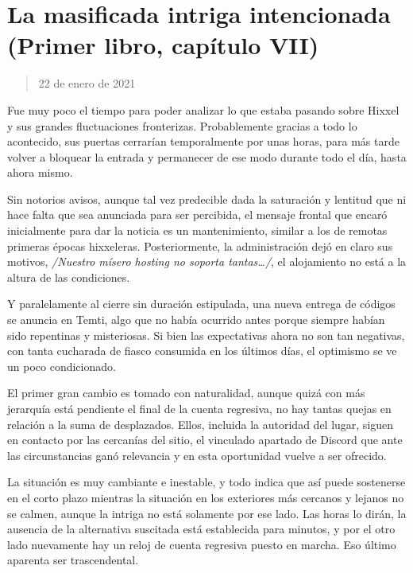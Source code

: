 \documentclass[
]{book}
\begin{document}
\hypertarget{la-masificada-intriga-intencionada-primer-libro-capuxedtulo-vii}{%
\section{La masificada intriga intencionada (Primer libro, capítulo VII)}\label{la-masificada-intriga-intencionada-primer-libro-capuxedtulo-vii}}

\begin{quote}
22 de enero de 2021
\end{quote}

Fue muy poco el tiempo para poder analizar lo que estaba pasando sobre Hixxel y sus grandes fluctuaciones fronterizas. Probablemente gracias a todo lo acontecido, sus puertas cerrarían temporalmente por unas horas, para más tarde volver a bloquear la entrada y permanecer de ese modo durante todo el día, hasta ahora mismo.

Sin notorios avisos, aunque tal vez predecible dada la saturación y lentitud que ni hace falta que sea anunciada para ser percibida, el mensaje frontal que encaró inicialmente para dar la noticia es un mantenimiento, similar a los de remotas primeras épocas hixxeleras. Posteriormente, la administración dejó en claro sus motivos, \emph{/Nuestro mísero hosting no soporta tantas\ldots/}, el alojamiento no está a la altura de las condiciones.

Y paralelamente al cierre sin duración estipulada, una nueva entrega de códigos se anuncia en Temti, algo que no había ocurrido antes porque siempre habían sido repentinas y misteriosas. Si bien las expectativas ahora no son tan negativas, con tanta cucharada de fiasco consumida en los últimos días, el optimismo se ve un poco condicionado.

El primer gran cambio es tomado con naturalidad, aunque quizá con más jerarquía está pendiente el final de la cuenta regresiva, no hay tantas quejas en relación a la suma de desplazados. Ellos, incluida la autoridad del lugar, siguen en contacto por las cercanías del sitio, el vinculado apartado de Discord que ante las circunstancias ganó relevancia y en esta oportunidad vuelve a ser ofrecido.

La situación es muy cambiante e inestable, y todo indica que así puede sostenerse en el corto plazo mientras la situación en los exteriores más cercanos y lejanos no se calmen, aunque la intriga no está solamente por ese lado. Las horas lo dirán, la ausencia de la alternativa suscitada está establecida para minutos, y por el otro lado nuevamente hay un reloj de cuenta regresiva puesto en marcha. Eso último aparenta ser trascendental.
\end{document}
